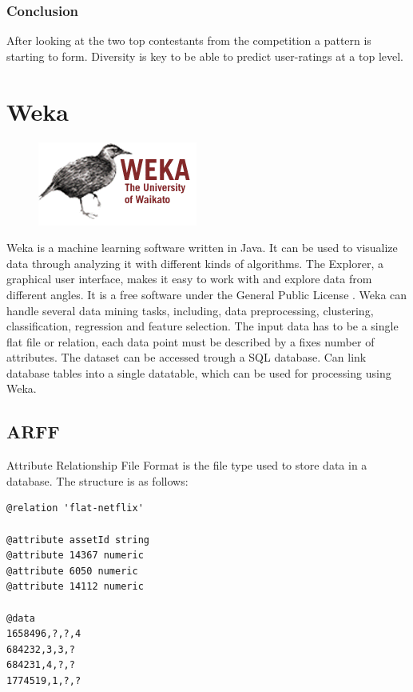 \subsubsection{Conclusion}
After looking at the two top contestants from the competition a pattern is starting to form. Diversity is key to be able to predict user-ratings at a top level.




\section{Weka}

\begin{figure}
\vspace{-30pt}
\centering
\includegraphics[width = .25\textwidth]{image/Weka-logo.png}
\end{figure}


Weka is a machine learning software written in Java. It can be used to visualize data through analyzing it with different kinds of algorithms. The Explorer, a graphical user interface, makes it easy to work with and explore data from different angles. It is a free software under the General Public License \cite{GNU}. Weka can handle several data mining tasks, including, data preprocessing, clustering, classification, regression and feature selection. The input data has to be a single flat file or relation, each data point must be described by a fixes number of attributes. The dataset can be accessed trough a SQL database. Can link database tables into a single datatable, which can be used for processing using Weka.


\subsection{ARFF}
Attribute Relationship File Format is the file type used to store data in a database. The structure is as follows:

\begin{lstlisting}[caption={ARFF Example},label={lst:arffEx},captionpos=b]
@relation 'flat-netflix'

@attribute assetId string
@attribute 14367 numeric
@attribute 6050 numeric
@attribute 14112 numeric

@data
1658496,?,?,4
684232,3,3,?
684231,4,?,?
1774519,1,?,?
\end{lstlisting}

